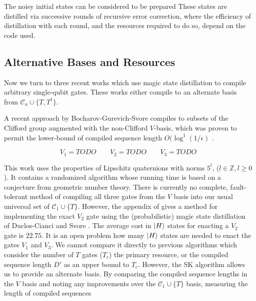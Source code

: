 The noisy initial states can be considered to be prepared
These states are distilled via successive rounds of recursive error
correction, where the efficiency of distillation with each round,
and the resources required to do so, depend on the code used.


\subsection{Alternative Bases and Resources}
\label{subsec:alt-resources}

Now we turn to three recent works which use magic state distillation to compile
arbitrary single-qubit gates. These works either compile to an alternate
basis from $\mathcal{C}_n \cup \{T,T^{\dagger}\}$.

A recent approach by Bocharov-Gurevich-Svore \cite{Bocharov2013}
compiles to subsets of the Clifford group augmented with the non-Clifford
$V$-basis, which was proven to permit the lower-bound of compiled sequence length
$O(\log^1(1/\epsilon)$
\cite{Harrow2003}.

\begin{equation}
V_1 = TODO \qquad V_2 = TODO \qquad V_3 = TODO
\end{equation}

This work uses the properties of Lipschitz quaternions with norms $5^l$, ($l \in \mathbb{Z}, l \ge 0$). It
contains a randomized algorithm whose running time is based on a conjecture from geometric number theory.
There is currently no complete, fault-tolerant method of compiling all three gates from the $V$ basis into
our usual universal set of $\mathcal{C}_1 \cup \{T\}$. However, the appendix of \cite{Bocharov2013}
gives a method for implementing the exact $V_2$ gate using the (probabilistic) magic state distillation of
Duclos-Cianci and Svore \cite{DuclosCianci2012}. The average cost in $\left\vert{H}\right\rangle$
states for enacting a $V_2$ gate is $22.75$. It is an open problem how many
$\left\vert{H}\right\rangle$ states are needed to enact the gates $V_1$ and $V_3$.
We cannot compare it directly to previous algorithms which consider the number of $T$ gates ($T_c$)
the primary resource, or the compiled sequence length $D'$ as an upper bound to $T_c$.
However, the SK algorithm allows us to provide an alternate basis. By
comparing the compiled sequence lengths in the $V$ basis and noting any
improvements over the $\mathcal{C}_1 \cup \{T\}$ basis, 
measuring the length of compiled sequences 

